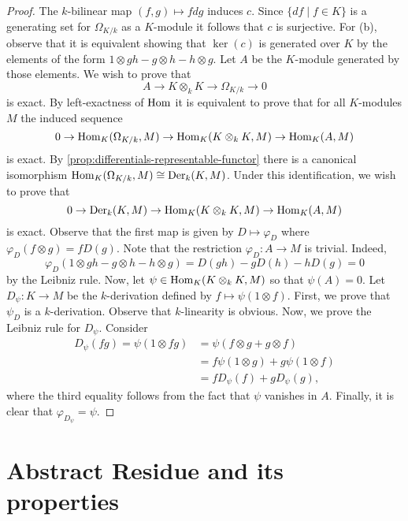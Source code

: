\begin{proof}
	The $k$-bilinear map $(f,g) \mapsto fdg$ induces $c$. Since $\{df \mid f\in K\}$ is a generating set for $\Omega_{K/k}$ as a $K$-module it follows that $c$ is surjective. For (b), observe that it is equivalent showing that $\ker(c)$ is generated over $K$ by the elements of the form $1 \otimes gh - g \otimes h - h \otimes g$. Let $A$ be the $K$-module generated by those elements. We wish to prove that
	\[
		A \to K \otimes_{k} K \to \Omega_{K/k} \to 0
	\]
	is exact. By left-exactness of $\operatorname{Hom}$ it is equivalent to prove that for all $K$-modules $M$ the induced sequence
	\[
		0 \to \operatorname{Hom}_{K}(\Omega_{K/k}, M) \to \operatorname{Hom}_{K}(K \otimes_{k} K, M) \to \operatorname{Hom}_{K}(A, M) 
	\]
	is exact. By \cref{prop:differentials-representable-functor} there is a canonical isomorphism $\operatorname{Hom}_{K}(\Omega_{K/k}, M) \cong \operatorname{Der}_{k}(K, M)$. Under this identification, we wish to prove that
	\[
		0 \to \operatorname{Der}_{k}(K, M) \to \operatorname{Hom}_{K}(K \otimes_{k} K, M) \to \operatorname{Hom}_{K}(A, M) 
	\]
	is exact. Observe that the first map is given by $D \mapsto \varphi_{D}$ where $\varphi_{D}(f \otimes g) = f D(g)$. Note that the restriction $\varphi_{D}\colon A \to M$ is trivial. Indeed,
	\[
		\varphi_{D}(1 \otimes gh - g \otimes h - h \otimes g) = D(gh) - gD(h) - hD(g) = 0
	\]
	by the Leibniz rule. Now, let $\psi\in \operatorname{Hom}_{K}(K \otimes_{k} K, M)$ so that $\psi(A) = 0$. Let $D_{\psi}\colon K \to M$ be the $k$-derivation defined by $f \mapsto \psi(1 \otimes f)$. First, we prove that $\psi_{D}$ is a $k$-derivation. Observe that $k$-linearity is obvious. Now, we prove the Leibniz rule for $D_{\psi}$. Consider
	\begin{align*}
		D_{\psi}(fg) = \psi(1 \otimes fg) &= \psi(f \otimes g + g \otimes f) \\ &= f \psi (1 \otimes g) + g \psi (1 \otimes f) \\ &= f D_{\psi} (f) + g D_{\psi} (g),
	\end{align*}
	where the third equality follows from the fact that $\psi$ vanishes in $A$. Finally, it is clear that $\varphi_{D_{\psi}} = \psi$. 
\end{proof}
\section{Abstract Residue and its properties}
